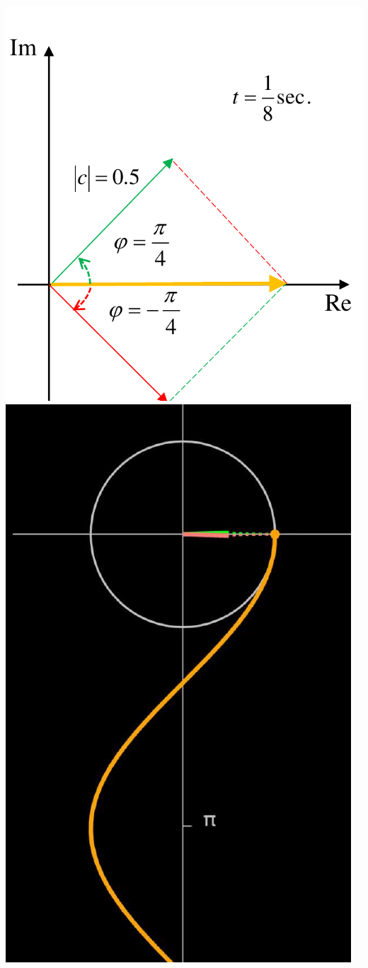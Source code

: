 \documentclass[a4paper, 10pt]{report}
\begin{document}
\begin{center}
\includegraphics[scale=0.4]{4.pdf} 
\hspace{1cm}
\includegraphics[scale=0.4]{5.pdf}

\end{center}
\end{document}
